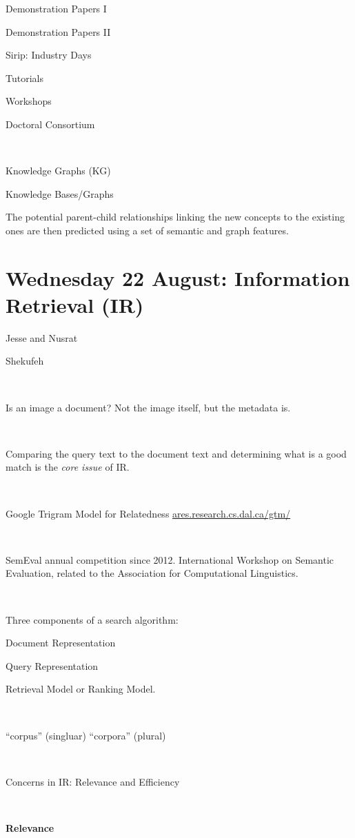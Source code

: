 \documentclass[11pt]{article}
\begin{document}
\begin{spacing}{1.2}
Demonstration Papers I

Demonstration Papers II

Sirip:  Industry Days

Tutorials

Workshops

Doctoral Consortium





\

Knowledge Graphs (KG)

Knowledge Bases/Graphs

The potential parent-child relationships linking the new concepts to the existing ones are then predicted using a set of semantic and graph features.

\section{Wednesday 22 August:  Information Retrieval (IR)}

Jesse and Nusrat

Shekufeh

\

Is an image a document?  Not the image itself, but the metadata is.  

\

Comparing the query text to the document text and determining what is a good match is the {\it core issue} of IR.  

\

Google Trigram Model for Relatedness  \url{ares.research.cs.dal.ca/gtm/}

\

SemEval annual competition since 2012.  International Workshop on Semantic Evaluation, related to the Association for Computational Linguistics.  

\

Three components of a search algorithm:

Document Representation

Query Representation

Retrieval Model or Ranking Model.  

\

``corpus'' (singluar) ``corpora'' (plural)

\

Concerns in IR:   Relevance and Efficiency

\

{\bf Relevance}


\end{spacing}
\end{document}

